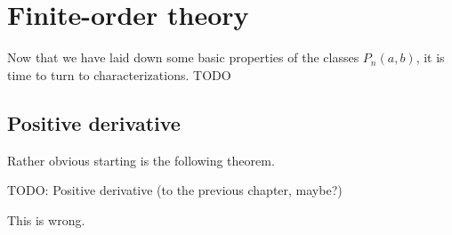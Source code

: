 \chapter{Finite-order theory}

Now that we have laid down some basic properties of the classes $P_{n}(a, b)$, it is time to turn to characterizations. TODO

\section{Positive derivative}

Rather obvious starting is the following theorem.

\begin{lause}
	TODO: Positive derivative (to the previous chapter, maybe?)
\end{lause}

This is wrong.